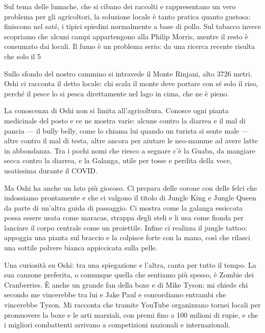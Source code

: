 Sul tema delle lumache, che si cibano dei raccolti e rappresentano un vero problema per gli agricoltori, la soluzione locale è tanto pratica quanto gustosa: finiscono nel saté, i tipici spiedini normalmente a base di pollo. Sul tabacco invece scopriamo che alcuni campi appartengono alla Philip Morris, mentre il resto è consumato dai locali. Il fumo è un problema serio: da una ricerca recente risulta che solo il 5%

Sullo sfondo del nostro cammino si intravede il Monte Rinjani, alto 3726 metri. Oshi ci racconta il detto locale: chi scala il monte deve portare con sé solo il riso, perché il pesce lo si pesca direttamente nel lago in cima, che ne è pieno.

La conoscenza di Oshi non si limita all'agricoltura. Conosce ogni pianta medicinale del posto e ce ne mostra varie: alcune contro la diarrea e il mal di pancia — il bully belly, come lo chiama lui quando un turista si sente male — altre contro il mal di testa, altre ancora per aiutare le neo-mamme ad avere latte in abbondanza. Tra i pochi nomi che riesco a segnare c'è la Guaba, da mangiare secca contro la diarrea, e la Galanga, utile per tosse e perdita della voce, usatissima durante il COVID.

Ma Oshi ha anche un lato più giocoso. Ci prepara delle corone con delle felci che indossiamo prontamente e che ci valgono il titolo di Jungle King e Jungle Queen da parte di un'altra guida di passaggio. Ci mostra come la galanga essiccata possa essere usata come maracas, strappa degli steli e li usa come fionda per lanciare il corpo centrale come un proiettile. Infine ci realizza il jungle tattoo: appoggia una pianta sul braccio e la colpisce forte con la mano, così che rilasci una sottile polvere bianca appiccicata sulla pelle.

Una curiosità su Oshi: tra una spiegazione e l'altra, canta per tutto il tempo. La sua canzone preferita, o comunque quella che sentiamo più spesso, è Zombie dei Cranberries. È anche un grande fan della boxe e di Mike Tyson: mi chiede chi secondo me vincerebbe tra lui e Jake Paul e concordiamo entrambi che vincerebbe Tyson. Mi racconta che tramite YouTube organizzano tornei locali per promuovere la boxe e le arti marziali, con premi fino a 100 milioni di rupie, e che i migliori combattenti arrivano a competizioni nazionali e internazionali.

